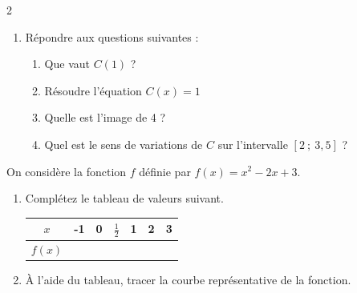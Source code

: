 \documentclass[10pt,a4paper]{article}
\begin{document}
\begin{multicols}{2}
\begin{exo}[][]
\begin{enumerate}
    \item Répondre aux questions suivantes :\begin{enumerate}
        \item Que vaut \(C(1)\) ?
        \item Résoudre l'équation \(C(x) = 1\)
        \item Quelle est l'image de 4 ?
        \item Quel est le sens de variations de \(C\) sur l'intervalle \([2\ ;\ 3,5]\) ?
    \end{enumerate}
\end{enumerate}
\end{exo}

\begin{exo}[][]
    On considère la fonction \(f\) définie par \(f(x)=x^2-2x+3\). 


    \begin{enumerate}
    \item Complétez le tableau de valeurs suivant.
    
    \begin{center}
        \renewcommand{\arraystretch}{1.5} %
        \setlength{\tabcolsep}{0.3cm} %
        \begin{tabular}{|c|c|c|c|c|c|c|}
        \hline
        \(x\) & -1 & 0 & \(\frac{1}{2}\) & 1 & 2 & 3  \\
        \hline
        \(f(x)\) &  &  &  &  &  &  \\
        \hline
        \end{tabular}
    \end{center}
    
    \item À l'aide du tableau, tracer la courbe représentative de la fonction.
    
    \hspace{-1cm}
    \end{enumerate}
\end{exo}


\end{multicols}
\end{document}
